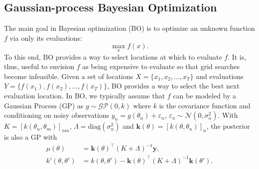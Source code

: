 \documentclass[twoside]{article}
\newcommand{\mcN}{\mathcal{N}}
\begin{document}
\subsection{Gaussian-process Bayesian Optimization}
The main goal in Bayesian optimization (BO) is to optimize an unknown function $f$ via only its evaluations: 
\begin{equation}
    \max_x f(x).
\end{equation}
To this end, BO provides a way to select locations at which to evaluate $f$. 
It is, thus, useful to envision $f$ as being expensive to evaluate so that grid searches become infeasible. Given a set of locations $X=\{x_1,x_2,\dots,x_T\}$ and evaluations $Y=\{f(x_1),f(x_2),\dots,f(x_T)\}$, BO provides a way to select the best next evaluation location. %
In BO, we typically assume that $f$ can be modeled by a Gaussian Process (GP) as $g \sim \mathcal{GP}(0, k)$ where  $k$ is the covariance function and conditioning on noisy observations $y_n = g(\theta_n) + \varepsilon_n$, $\varepsilon_n \sim \mcN(0, \sigma_n^2)$.  With $K = [k(\theta_n, \theta_m)]_{nm}$, $\Lambda = \mathrm{diag}(\sigma_n^2)$ and $\mathbf{k}(\theta) = [k(\theta, \theta_n)]_n$, the posterior is also a GP with \citep{williams2006gaussian}
\begin{align}
    \mu(\theta) &= \mathbf{k}(\theta)^\top (K + \Lambda)^{-1} \mathbf{y}, \nonumber \\
    k'(\theta, \theta') &= k(\theta, \theta') - \mathbf{k}(\theta)^\top (K + \Lambda)^{-1} \mathbf{k}(\theta').
\end{align}
\end{document}
